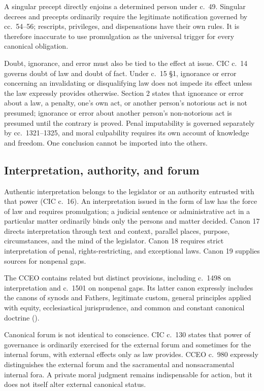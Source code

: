 A singular precept directly enjoins a determined person under c.~49. Singular decrees and precepts ordinarily require the legitimate notification governed by cc.~54--56; rescripts, privileges, and dispensations have their own rules. It is therefore inaccurate to use promulgation as the universal trigger for every canonical obligation.

Doubt, ignorance, and error must also be tied to the effect at issue. CIC c.~14 governs doubt of law and doubt of fact. Under c.~15 \S1, ignorance or error concerning an invalidating or disqualifying law does not impede its effect unless the law expressly provides otherwise. Section 2 states that ignorance or error about a law, a penalty, one's own act, or another person's notorious act is not presumed; ignorance or error about another person's non-notorious act is presumed until the contrary is proved. Penal imputability is governed separately by cc.~1321--1325, and moral culpability requires its own account of knowledge and freedom. One conclusion cannot be imported into the others.

\subsection{Interpretation, authority, and forum}

Authentic interpretation belongs to the legislator or an authority entrusted with that power (CIC c.~16). An interpretation issued in the form of law has the force of law and requires promulgation; a judicial sentence or administrative act in a particular matter ordinarily binds only the persons and matter decided. Canon 17 directs interpretation through text and context, parallel places, purpose, circumstances, and the mind of the legislator. Canon 18 requires strict interpretation of penal, rights-restricting, and exceptional laws. Canon 19 supplies sources for nonpenal gaps.

The CCEO contains related but distinct provisions, including c.~1498 on interpretation and c.~1501 on nonpenal gaps. Its latter canon expressly includes the canons of synods and Fathers, legitimate custom, general principles applied with equity, ecclesiastical jurisprudence, and common and constant canonical doctrine ().

Canonical forum is not identical to conscience. CIC c.~130 states that power of governance is ordinarily exercised for the external forum and sometimes for the internal forum, with external effects only as law provides. CCEO c.~980 expressly distinguishes the external forum and the sacramental and nonsacramental internal fora. A private moral judgment remains indispensable for action, but it does not itself alter external canonical status.

